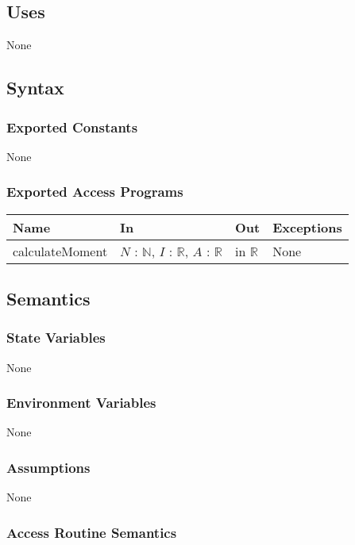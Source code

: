 \documentclass[12pt, titlepage]{article}
\begin{document}
\subsection{Uses}
None

\subsection{Syntax}

\subsubsection{Exported Constants}
None

\subsubsection{Exported Access Programs}
\begin{center}
\begin{tabular}{p{3cm} p{4cm} p{4cm} p{3cm}}
\hline
\textbf{Name} & \textbf{In} & \textbf{Out} & \textbf{Exceptions} \\
\hline
calculateMoment & $N$ : $\mathbb{N}$, $I$ : $\mathbb{R}$, $A$ : $\mathbb{R}$  & in $\mathbb{R}$ & None \\
\hline
\end{tabular}
\end{center}

\subsection{Semantics}

\subsubsection{State Variables}
None

\subsubsection{Environment Variables}
None

\subsubsection{Assumptions}
None 

\subsubsection{Access Routine Semantics}
\end{document}
